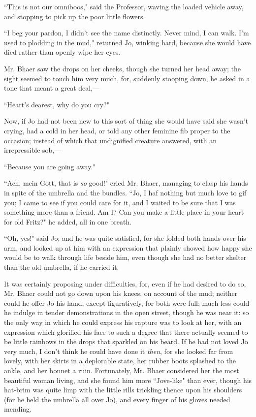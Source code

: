 ``This is not our omniboos," said the Professor, waving the loaded
vehicle away, and stopping to pick up the poor little flowers.

``I beg your pardon, I didn't see the name distinctly.
Never mind, I can walk. I'm used to plodding in the
mud," returned Jo, winking hard, because she would have died rather than
openly wipe her eyes.

Mr. Bhaer saw the drops on her cheeks, though she turned her head away;
the sight seemed to touch him very much, for, suddenly stooping down, he
asked in a tone that meant a great deal,---

``Heart's dearest, why do you cry?"

Now, if Jo had not been new to this sort of thing she would have said
she wasn't crying, had a cold in her head, or told any
other feminine fib proper to the occasion; instead of which that
undignified creature answered, with an irrepressible sob,---

``Because you are going away."

``Ach, mein Gott, that is \emph{so} good!" cried Mr. Bhaer, managing to
clasp his hands in spite of the umbrella and the bundles. ``Jo, I haf
nothing but much love to gif you; I came to see if you could care for
it, and I waited to be sure that I was something more than a friend. Am
I? Can you make a little place in your heart for old Fritz?" he added,
all in one breath.

``Oh, yes!" said Jo; and he was quite satisfied, for she folded both
hands over his arm, and looked up at him with an expression that plainly
showed how happy she would be to walk through life beside him, even
though she had no better shelter than the old umbrella, if he carried
it.

It was certainly proposing under difficulties, for, even if he had
desired to do so, Mr. Bhaer could not go down upon his knees, on account
of the mud; neither could he offer Jo his hand, except figuratively, for
both were full; much less could he indulge in tender demonstrations in
the open street, though he was near it: so the only way in which he
could express his rapture was to look at her, with an expression which
glorified his face to such a degree that there actually seemed to be
little rainbows in the drops that sparkled on his beard. If he had not
loved Jo very much, I don't think he could have done it
\emph{then}, for she looked far from lovely, with her skirts in a
deplorable state, her rubber boots splashed to the ankle, and her bonnet
a ruin. Fortunately, Mr. Bhaer considered her the most beautiful woman
living, and she found him more ``Jove-like" than ever, though his
hat-brim was quite limp with the little rills trickling thence upon his
shoulders (for he held the umbrella all over Jo), and every finger of
his gloves needed mending.


